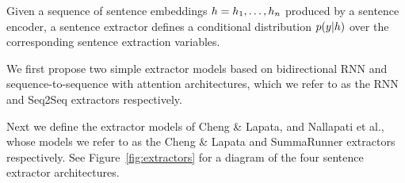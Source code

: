 Given a sequence of sentence embeddings $\sentEmb = \sentEmb[1], \ldots, \sentEmb[\docSize]$ produced by a sentence encoder, 
a sentence extractor defines a conditional distribution $p(\slabel|\sentEmb)$
over the corresponding sentence extraction variables.

We first propose two simple extractor models based on bidirectional RNN 
and sequence-to-sequence with attention architectures, 
which we refer to as the RNN and 
Seq2Seq extractors respectively.

Next we define the extractor models of Cheng \& Lapata, and Nallapati et al.,
whose models we refer to as the Cheng \& Lapata and SummaRunner extractors
respectively.
See Figure~\ref{fig:extractors} for a diagram of the 
four sentence extractor architectures.




